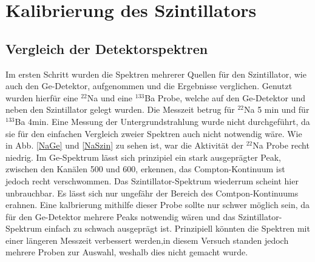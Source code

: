 \section{Kalibrierung des Szintillators}

\subsection{Vergleich der Detektorspektren}

Im ersten Schritt wurden die Spektren mehrerer Quellen für den Szintillator, wie auch den Ge-Detektor, aufgenommen und die Ergebnisse verglichen.
Genutzt wurden hierfür eine $^{22}$Na und eine $^{133}$Ba Probe, welche auf den Ge-Detektor und neben den Szintillator gelegt wurden.
Die Messzeit betrug für $^{22}$Na 5 min und für $^{133}$Ba 4min.
Eine Messung der Untergrundstrahlung wurde nicht durchgeführt, da sie für den einfachen Vergleich zweier Spektren auch nicht notwendig wäre.
Wie in Abb. \ref{NaGe} und \ref{NaSzin} zu sehen ist, war die Aktivität der $^{22}$Na Probe recht niedrig.
Im Ge-Spektrum lässt sich prinzipiel ein stark ausgeprägter Peak, zwischen den Kanälen 500 und 600, erkennen, das Compton-Kontinuum ist jedoch recht verschwommen.
Das Szintillator-Spektrum wiederrum scheint hier unbrauchbar.
Es lässt sich nur ungefähr der Bereich des Comtpon-Kontinuums erahnen.
Eine kalbrierung mithilfe dieser Probe sollte nur schwer möglich sein, da für den Ge-Detektor mehrere Peaks notwendig wären und das Szintillator-Spektrum einfach zu schwach ausgeprägt ist.
Prinzipiell könnten die Spektren mit einer längeren Messzeit verbessert werden,in diesem Versuch standen jedoch mehrere Proben zur Auswahl, weshalb dies nicht gemacht wurde.

